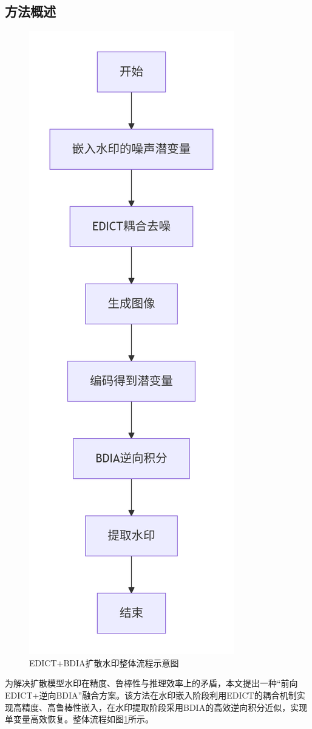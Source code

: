 \documentclass[conference]{IEEEtran}
\begin{document}
\subsection{方法概述}
\begin{figure}[htbp]
	\centering
	\includegraphics[width=0.95\linewidth,height=0.7\textheight]{./img/fig2.png}
	\caption{EDICT+BDIA扩散水印整体流程示意图}
	\label{fig:framework}
\end{figure}
为解决扩散模型水印在精度、鲁棒性与推理效率上的矛盾，本文提出一种“前向EDICT+逆向BDIA”融合方案。该方法在水印嵌入阶段利用EDICT的耦合机制实现高精度、高鲁棒性嵌入，在水印提取阶段采用BDIA的高效逆向积分近似，实现单变量高效恢复。整体流程如图\ref{fig:framework}所示。
\end{document}
